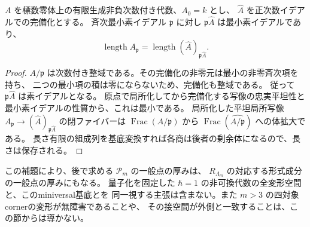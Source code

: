 \begin{lemma}[錐の成分と形式化]
\label{lem:cone-completion-length-v33}
$A$ を標数零体上の有限生成非負次数付き代数、$A_0=k$ とし、
$\widehat A$ を正次数イデアルでの完備化とする。
斉次最小素イデアル $\mathfrak p$ に対し $\mathfrak p\widehat A$ は最小素イデアルであり、
\[
 \operatorname{length}A_{\mathfrak p}
 =\operatorname{length}(\widehat A)_{\mathfrak p\widehat A}.
\]
\end{lemma}

\begin{proof}
$A/\mathfrak p$ は次数付き整域である。その完備化の非零元は最小の非零斉次項を持ち、
二つの最小項の積は零にならないため、完備化も整域である。
従って $\mathfrak p\widehat A$ は素イデアルとなる。
原点で局所化してから完備化する写像の忠実平坦性と最小素イデアルの性質から、これは最小である。
局所化した平坦局所写像
$A_{\mathfrak p}\to(\widehat A)_{\mathfrak p\widehat A}$ の閉ファイバーは
$\operatorname{Frac}(A/\mathfrak p)$ から
$\operatorname{Frac}(\widehat{A/\mathfrak p})$ への体拡大である。
長さ有限の組成列を基底変換すれば各商は後者の剰余体になるので、長さは保存される。
\end{proof}

この補題により、後で求める $\mathscr P_m$ の一般点の厚みは、
$R_{\Lambda_m}$ の対応する形式成分の一般点の厚みにもなる。
量子化を固定した $\hbar=1$ の非可換代数の全変形空間と、このminiversal基底とを
同一視する主張は含まない。また $m>3$ の四対象cornerの変形が無障害であることや、
その接空間が外側と一致することは、この節からは導かない。
